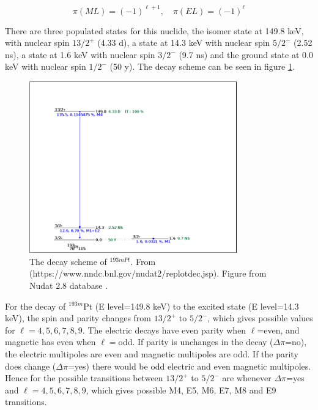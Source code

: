 \begin{equation}
\pi (ML)= (-1)^{\ell+1}, \quad \pi(EL) = (-1)^\ell    
\end{equation}

There are three populated states for this nuclide, the isomer state at 149.8 keV, with nuclear spin $13/2^+$ (4.33 d), a state at 14.3 keV with nuclear spin $5/2^-$ (2.52 ns), a state at 1.6 keV with nuclear spin $3/2^-$ (9.7 ns) and the ground state at 0.0 keV with nuclear spin $1/2^-$ (50 y)\cite{ShamsuzzohaBasunia2017a}. The decay scheme can be seen in figure \ref{fig:decayscheme_193mPt}. 

\begin{figure}
    \centering
    \includegraphics[width=0.8\textwidth]{Theory/decay_scheme_193mPt.png}
    \caption{The decay scheme of $^{193mPt}$. From (https://www.nndc.bnl.gov/nudat2/replotdec.jsp). Figure from Nudat 2.8 database \cite{VRAPCENJAKLidijaZERKIN2015}. }
    \label{fig:decayscheme_193mPt}
\end{figure}

For the decay of $^{193m}$Pt (E level=149.8 keV) to the excited state (E level=14.3 keV), the spin and parity changes from $13/2^+$ to $5/2^-$, which gives possible values for $\ell=4,5,6,7,8,9$. The electric decays have even parity when $\ell$=even, and magnetic has even when $\ell=$odd. If parity is unchanges in the decay ($\Delta\pi$=no), the electric multipoles are even and magnetic multipoles are odd. If the parity does change ($\Delta \pi$=yes) there would be odd electric and even magnetic multipoles. Hence for the possible transitions between $13/2^+$ to $5/2^-$ are whenever $\Delta \pi$=yes and $\ell=4,5,6,7,8,9$, which gives possible M4, E5, M6, E7, M8 and E9 transitions. \\

